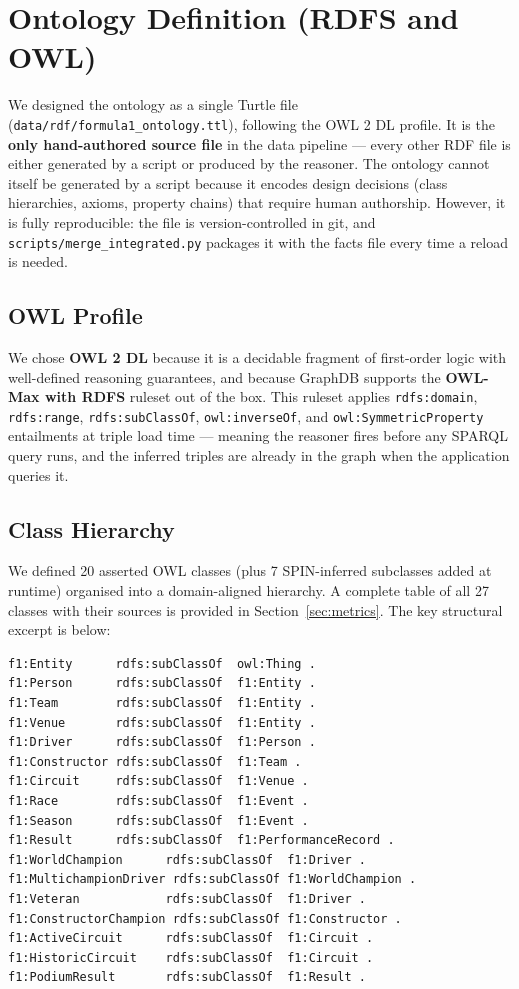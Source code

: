 \documentclass[12pt,a4paper]{article}
\begin{document}
\section{Ontology Definition (RDFS and OWL)}

We designed the ontology as a single Turtle file (\texttt{data/rdf/formula1\_ontology.ttl}),
following the OWL 2 DL profile. It is the \textbf{only hand-authored source file}
in the data pipeline --- every other RDF file is either generated by a script or
produced by the reasoner.
The ontology cannot itself be generated by a script because it encodes
design decisions (class hierarchies, axioms, property chains) that require human
authorship. However, it is fully reproducible: the file is version-controlled in
git, and \texttt{scripts/merge\_integrated.py} packages it with the facts file
every time a reload is needed.

\subsection{OWL Profile}

We chose \textbf{OWL 2 DL} because it is a decidable fragment of first-order logic
with well-defined reasoning guarantees, and because GraphDB supports the
\textbf{OWL-Max with RDFS} ruleset out of the box. This ruleset applies
\texttt{rdfs:domain}, \texttt{rdfs:range}, \texttt{rdfs:subClassOf},
\texttt{owl:inverseOf}, and \texttt{owl:SymmetricProperty} entailments at triple
load time --- meaning the reasoner fires before any SPARQL query runs, and the
inferred triples are already in the graph when the application queries it.

\subsection{Class Hierarchy}

We defined 20 asserted OWL classes (plus 7 SPIN-inferred subclasses added at runtime)
organised into a domain-aligned hierarchy. A complete table of all 27 classes with their
sources is provided in Section~\ref{sec:metrics}. The key structural excerpt is below:

\begin{lstlisting}[style=turtle, caption={Top-level class hierarchy in the ontology}]
f1:Entity      rdfs:subClassOf  owl:Thing .
f1:Person      rdfs:subClassOf  f1:Entity .
f1:Team        rdfs:subClassOf  f1:Entity .
f1:Venue       rdfs:subClassOf  f1:Entity .
f1:Driver      rdfs:subClassOf  f1:Person .
f1:Constructor rdfs:subClassOf  f1:Team .
f1:Circuit     rdfs:subClassOf  f1:Venue .
f1:Race        rdfs:subClassOf  f1:Event .
f1:Season      rdfs:subClassOf  f1:Event .
f1:Result      rdfs:subClassOf  f1:PerformanceRecord .
f1:WorldChampion      rdfs:subClassOf  f1:Driver .
f1:MultichampionDriver rdfs:subClassOf f1:WorldChampion .
f1:Veteran            rdfs:subClassOf  f1:Driver .
f1:ConstructorChampion rdfs:subClassOf f1:Constructor .
f1:ActiveCircuit      rdfs:subClassOf  f1:Circuit .
f1:HistoricCircuit    rdfs:subClassOf  f1:Circuit .
f1:PodiumResult       rdfs:subClassOf  f1:Result .
\end{lstlisting}
\end{document}
